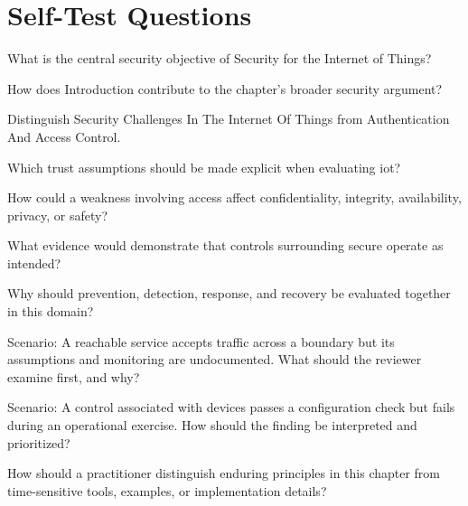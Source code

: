 \documentclass[11pt,letterpaper]{article}
\begin{document}
\section*{Self-Test Questions}
\begin{CornellRecallList}
\item What is the central security objective of Security for the Internet of Things?
\item How does Introduction contribute to the chapter's broader security argument?
\item Distinguish Security Challenges In The Internet Of Things from Authentication And Access Control.
\item Which trust assumptions should be made explicit when evaluating iot?
\item How could a weakness involving access affect confidentiality, integrity, availability, privacy, or safety?
\item What evidence would demonstrate that controls surrounding secure operate as intended?
\item Why should prevention, detection, response, and recovery be evaluated together in this domain?
\item Scenario: A reachable service accepts traffic across a boundary but its assumptions and monitoring are undocumented. What should the reviewer examine first, and why?
\item Scenario: A control associated with devices passes a configuration check but fails during an operational exercise. How should the finding be interpreted and prioritized?
\item How should a practitioner distinguish enduring principles in this chapter from time-sensitive tools, examples, or implementation details?
\end{CornellRecallList}
\end{document}
